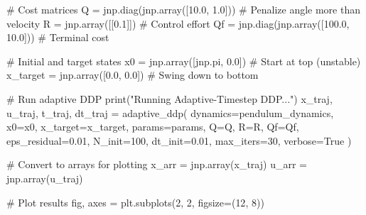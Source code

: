 \documentclass[
  letterpaper,
  DIV=11,
  numbers=noendperiod]{scrartcl}
\newenvironment{Shaded}{\begin{snugshade}}{\end{snugshade}}
\newcommand{\BuiltInTok}[1]{\textcolor[rgb]{0.00,0.23,0.31}{#1}}
\newcommand{\CommentTok}[1]{\textcolor[rgb]{0.37,0.37,0.37}{#1}}
\newcommand{\DecValTok}[1]{\textcolor[rgb]{0.68,0.00,0.00}{#1}}
\newcommand{\FloatTok}[1]{\textcolor[rgb]{0.68,0.00,0.00}{#1}}
\newcommand{\NormalTok}[1]{\textcolor[rgb]{0.00,0.23,0.31}{#1}}
\newcommand{\OperatorTok}[1]{\textcolor[rgb]{0.37,0.37,0.37}{#1}}
\newcommand{\StringTok}[1]{\textcolor[rgb]{0.13,0.47,0.30}{#1}}
\newcommand{\VariableTok}[1]{\textcolor[rgb]{0.07,0.07,0.07}{#1}}
\begin{document}
\begin{Shaded}
\begin{Highlighting}[]
    \CommentTok{\# Cost matrices}
\NormalTok{    Q }\OperatorTok{=}\NormalTok{ jnp.diag(jnp.array([}\FloatTok{10.0}\NormalTok{, }\FloatTok{1.0}\NormalTok{]))  }\CommentTok{\# Penalize angle more than velocity}
\NormalTok{    R }\OperatorTok{=}\NormalTok{ jnp.array([[}\FloatTok{0.1}\NormalTok{]])                 }\CommentTok{\# Control effort}
\NormalTok{    Qf }\OperatorTok{=}\NormalTok{ jnp.diag(jnp.array([}\FloatTok{100.0}\NormalTok{, }\FloatTok{10.0}\NormalTok{]))  }\CommentTok{\# Terminal cost}

    \CommentTok{\# Initial and target states}
\NormalTok{    x0 }\OperatorTok{=}\NormalTok{ jnp.array([jnp.pi, }\FloatTok{0.0}\NormalTok{])      }\CommentTok{\# Start at top (unstable)}
\NormalTok{    x\_target }\OperatorTok{=}\NormalTok{ jnp.array([}\FloatTok{0.0}\NormalTok{, }\FloatTok{0.0}\NormalTok{])   }\CommentTok{\# Swing down to bottom}

    \CommentTok{\# Run adaptive DDP}
    \BuiltInTok{print}\NormalTok{(}\StringTok{"Running Adaptive{-}Timestep DDP..."}\NormalTok{)}
\NormalTok{    x\_traj, u\_traj, t\_traj, dt\_traj }\OperatorTok{=}\NormalTok{ adaptive\_ddp(}
\NormalTok{        dynamics}\OperatorTok{=}\NormalTok{pendulum\_dynamics,}
\NormalTok{        x0}\OperatorTok{=}\NormalTok{x0,}
\NormalTok{        x\_target}\OperatorTok{=}\NormalTok{x\_target,}
\NormalTok{        params}\OperatorTok{=}\NormalTok{params,}
\NormalTok{        Q}\OperatorTok{=}\NormalTok{Q, R}\OperatorTok{=}\NormalTok{R, Qf}\OperatorTok{=}\NormalTok{Qf,}
\NormalTok{        eps\_residual}\OperatorTok{=}\FloatTok{0.01}\NormalTok{,}
\NormalTok{        N\_init}\OperatorTok{=}\DecValTok{100}\NormalTok{,}
\NormalTok{        dt\_init}\OperatorTok{=}\FloatTok{0.01}\NormalTok{,}
\NormalTok{        max\_iters}\OperatorTok{=}\DecValTok{30}\NormalTok{,}
\NormalTok{        verbose}\OperatorTok{=}\VariableTok{True}
\NormalTok{    )}

    \CommentTok{\# Convert to arrays for plotting}
\NormalTok{    x\_arr }\OperatorTok{=}\NormalTok{ jnp.array(x\_traj)}
\NormalTok{    u\_arr }\OperatorTok{=}\NormalTok{ jnp.array(u\_traj)}

    \CommentTok{\# Plot results}
\NormalTok{    fig, axes }\OperatorTok{=}\NormalTok{ plt.subplots(}\DecValTok{2}\NormalTok{, }\DecValTok{2}\NormalTok{, figsize}\OperatorTok{=}\NormalTok{(}\DecValTok{12}\NormalTok{, }\DecValTok{8}\NormalTok{))}


\end{Highlighting}
\end{Shaded}
\end{document}
